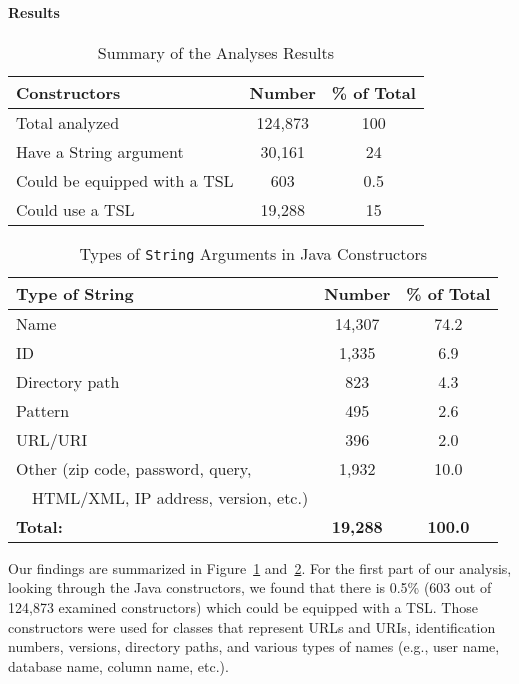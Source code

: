 \paragraph{Results} 

\begin{table}
   \centering
    \begin{tabular}[t]{l | c | c}
    \bf Constructors & \bf Number & \bf \% of Total \\ \hline
    Total analyzed & 124,873 & 100 \\
    Have a String argument & 30,161 & 24 \\
    Could be equipped with a TSL & 603 & 0.5 \\
    Could use a TSL & 19,288 & 15 \\
    \end{tabular}
    \vspace{0.15in}
    \caption{Summary of the Analyses Results}
    \label{t-summary}
\end{table}

\begin{table}
   \centering
    \begin{tabular}[t]{l | c | c}
    \bf Type of String & \bf Number & \bf \% of Total \\ \hline
    Name & 14,307 & 74.2 \\
    ID	& 1,335 & 6.9 \\
    Directory path& 823 & 4.3 \\
    Pattern & 495 & 2.6 \\
    URL/URI & 396 & 2.0 \\
    Other (zip code, password, query, & 1,932 & 10.0 \\
    ~~HTML/XML, IP address, version, etc.)  & & \\ \hline
    \bf Total: & \bf 19,288 & \bf 100.0
    \end{tabular}
    \vspace{0.15in}
    \caption{Types of \lstinline{String} Arguments in Java Constructors}
    \label{t-strs-in-constrs}
\end{table}

Our findings are summarized in Figure~\ref{t-summary} and~\ref{t-strs-in-constrs}. For the first part of our analysis, looking through the Java constructors, we found that there is 0.5\% (603 out of 124,873 examined constructors) which could be equipped with a TSL. Those constructors were used for classes that represent URLs and URIs, identification numbers, versions, directory paths, and various types of names (e.g., user name, database name, column name, etc.).

